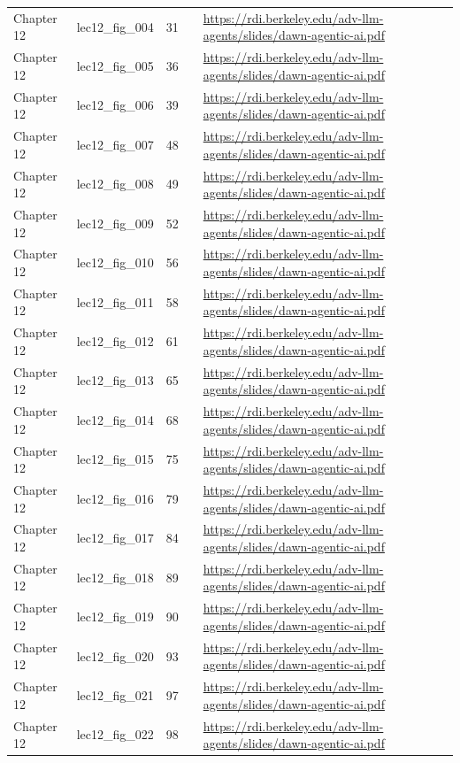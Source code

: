 \begin{longtable}{p{}p{}p{}p{}p{}}
Chapter 12 & lec12\_fig\_004 & 31 &  & \url{https://rdi.berkeley.edu/adv-llm-agents/slides/dawn-agentic-ai.pdf} \\
Chapter 12 & lec12\_fig\_005 & 36 &  & \url{https://rdi.berkeley.edu/adv-llm-agents/slides/dawn-agentic-ai.pdf} \\
Chapter 12 & lec12\_fig\_006 & 39 &  & \url{https://rdi.berkeley.edu/adv-llm-agents/slides/dawn-agentic-ai.pdf} \\
Chapter 12 & lec12\_fig\_007 & 48 &  & \url{https://rdi.berkeley.edu/adv-llm-agents/slides/dawn-agentic-ai.pdf} \\
Chapter 12 & lec12\_fig\_008 & 49 &  & \url{https://rdi.berkeley.edu/adv-llm-agents/slides/dawn-agentic-ai.pdf} \\
Chapter 12 & lec12\_fig\_009 & 52 &  & \url{https://rdi.berkeley.edu/adv-llm-agents/slides/dawn-agentic-ai.pdf} \\
Chapter 12 & lec12\_fig\_010 & 56 &  & \url{https://rdi.berkeley.edu/adv-llm-agents/slides/dawn-agentic-ai.pdf} \\
Chapter 12 & lec12\_fig\_011 & 58 &  & \url{https://rdi.berkeley.edu/adv-llm-agents/slides/dawn-agentic-ai.pdf} \\
Chapter 12 & lec12\_fig\_012 & 61 &  & \url{https://rdi.berkeley.edu/adv-llm-agents/slides/dawn-agentic-ai.pdf} \\
Chapter 12 & lec12\_fig\_013 & 65 &  & \url{https://rdi.berkeley.edu/adv-llm-agents/slides/dawn-agentic-ai.pdf} \\
Chapter 12 & lec12\_fig\_014 & 68 &  & \url{https://rdi.berkeley.edu/adv-llm-agents/slides/dawn-agentic-ai.pdf} \\
Chapter 12 & lec12\_fig\_015 & 75 &  & \url{https://rdi.berkeley.edu/adv-llm-agents/slides/dawn-agentic-ai.pdf} \\
Chapter 12 & lec12\_fig\_016 & 79 &  & \url{https://rdi.berkeley.edu/adv-llm-agents/slides/dawn-agentic-ai.pdf} \\
Chapter 12 & lec12\_fig\_017 & 84 &  & \url{https://rdi.berkeley.edu/adv-llm-agents/slides/dawn-agentic-ai.pdf} \\
Chapter 12 & lec12\_fig\_018 & 89 &  & \url{https://rdi.berkeley.edu/adv-llm-agents/slides/dawn-agentic-ai.pdf} \\
Chapter 12 & lec12\_fig\_019 & 90 &  & \url{https://rdi.berkeley.edu/adv-llm-agents/slides/dawn-agentic-ai.pdf} \\
Chapter 12 & lec12\_fig\_020 & 93 &  & \url{https://rdi.berkeley.edu/adv-llm-agents/slides/dawn-agentic-ai.pdf} \\
Chapter 12 & lec12\_fig\_021 & 97 &  & \url{https://rdi.berkeley.edu/adv-llm-agents/slides/dawn-agentic-ai.pdf} \\
Chapter 12 & lec12\_fig\_022 & 98 &  & \url{https://rdi.berkeley.edu/adv-llm-agents/slides/dawn-agentic-ai.pdf} \\
\bottomrule
\end{longtable}
\normalsize
